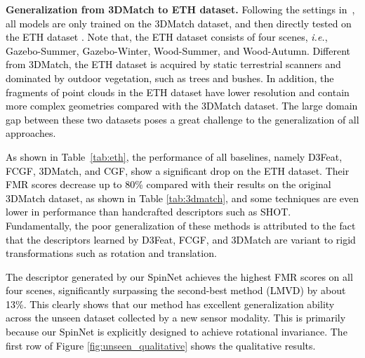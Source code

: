 \documentclass[final]{cvpr}
\newcommand{\qy}[1]{\textcolor{black}{#1}}
\newcommand{\bo}[1]{\textcolor{black}{#1}}
\newcommand{\nickname}{SpinNet}
\begin{document}
\textbf{Generalization from 3DMatch to ETH dataset.} \qy{Following the settings in~\cite{bai2020d3feat}, all models are only trained on the 3DMatch dataset, and then directly tested on the ETH dataset \cite{pomerleau2012challenging}. Note that, the ETH dataset consists of four scenes, \textit{i.e.}, Gazebo-Summer, Gazebo-Winter, Wood-Summer, and Wood-Autumn. Different from 3DMatch, the ETH dataset is acquired by static terrestrial scanners and dominated by outdoor vegetation, such as trees and bushes. In addition, the fragments of point clouds in the ETH dataset have lower resolution and contain more complex geometries compared with the 3DMatch dataset. The large domain gap between these two datasets poses a great challenge to the generalization of all approaches.}

\qy{
As shown in Table~\ref{tab:eth}, the performance of all baselines, namely D3Feat, FCGF, 3DMatch, and CGF, show a significant drop on the ETH dataset. Their FMR scores decrease up to 80\% compared with their results on the original 3DMatch dataset, as shown in Table \ref{tab:3dmatch}, and some techniques are even lower in performance than handcrafted descriptors such as SHOT. Fundamentally, the poor generalization of these methods is attributed to the fact that the descriptors learned by D3Feat, FCGF, and 3DMatch are variant to rigid transformations such as rotation and translation.} 

\bo{The descriptor generated by our \nickname{} achieves the highest FMR scores on all four scenes, significantly surpassing the second-best method (LMVD) by about 13\%. This clearly shows that our method has excellent generalization ability across the unseen dataset collected by a new sensor modality. This is primarily because our \nickname{} is explicitly designed to achieve rotational invariance. The first row of Figure \ref{fig:unseen_qualitative} shows the qualitative results.}
\end{document}
